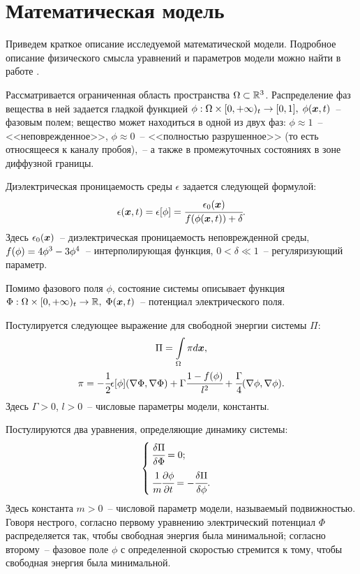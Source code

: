 
\section{Математическая модель}

Приведем краткое описание исследуемой математической модели. По\forcehyphenation дробное описание физического смысла уравнений и параметров модели можно найти в работе \cite{ponomarev_stability}.

Рассматривается ограниченная область пространства $\Omega \subset {\mathbb{R}}^3$. Распределение фаз вещества в ней задается гладкой функцией $\phi: \Omega \times [0, +\infty)_t \hm \to [0, 1], \; \phi(\vx, t)$~-- фазовым полем; вещество может находиться в одной из двух фаз: $\phi \approx 1$~-- <<неповрежденное>>, $\phi \approx 0$~-- <<полностью разрушенное>> (то есть относящееся к каналу пробоя),~-- а также в промежуточных состояниях в зоне диффузной границы.

Диэлектрическая проницаемость среды $\epsilon$ задается следующей формулой:
\[\epsilon({\boldsymbol{x}}, t) = \epsilon[\phi] = \cfrac{\epsilon_0({\boldsymbol{x}})}{f(\phi({\boldsymbol{x}}, t)) + \delta}.\]
Здесь $\epsilon_0({\boldsymbol{x}})$~-- диэлектрическая проницаемость неповрежденной среды, $f(\phi) \hm = 4\phi^3 - 3\phi^4$~-- интерполирующая функция, $0 < \delta \ll 1$~-- регуляризующий параметр.

Помимо фазового поля $\phi$, состояние системы описывает функция $\Phi: \Omega \hm \times [0, +\infty)_t \to \Real, \; \Phi(\vx, t)$~-- потенциал электрического поля.

Постулируется следующее выражение для свободной энергии системы $\Pi$:
\begin{gather*}
	\Pi = \int \limits_\Omega \pi d {\boldsymbol{x}}, \\
	\pi = -\cfrac{1}{2} \epsilon[\phi] (\nabla \Phi, \nabla \Phi) + \Gamma \cfrac{1 - f(\phi)}{l^2} + \cfrac{\Gamma}{4} (\nabla \phi, \nabla \phi).
\end{gather*}
Здесь $\Gamma > 0$, $l > 0$~-- числовые параметры модели, константы.

Постулируются два уравнения, определяющие динамику системы:
\begin{equation*}
\begin{cases}
	\cfrac{\delta \Pi}{\delta \Phi} = 0; \\[3mm]
	\cfrac{1}{m} \cfrac{\partial \phi}{\partial t} = -\cfrac{\delta \Pi}{\delta \phi}.
\end{cases}
\end{equation*}
Здесь константа $m > 0$~-- числовой параметр модели, называемый подвижностью. Говоря нестрого, согласно первому уравнению электрический потенциал $\Phi$ распределяется так, чтобы свободная энергия была минимальной; согласно второму~-- фазовое поле $\phi$ с определенной скоростью стремится к тому, чтобы свободная энергия была минимальной.

